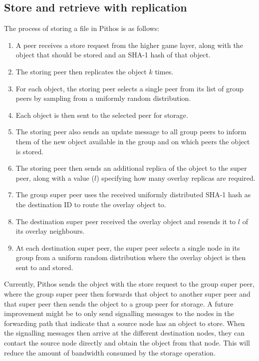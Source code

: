 \documentclass[10pt,a4paper,conference]{IEEEtran}
\begin{document}
\subsection{Store and retrieve with replication}
\label{store_retrieve}

The process of storing a file in Pithos is as follows:
\begin{enumerate}
\item A peer receives a store request from the higher game layer, along with the object that should be stored and an SHA-1 hash of that object.
\item The storing peer then replicates the object $k$ times.
\item For each object, the storing peer selects a single peer from its list of group peers by sampling from a uniformly random distribution.
\item Each object is then sent to the selected peer for storage.
\item The storing peer also sends an update message to all group peers to inform them of the new object available in the group and on which peers
    the object is stored.
\item The storing peer then sends an additional replica of the object to the super peer, along with a value ($l$) specifying how many overlay
    replicas are required.
\item The group super peer uses the received uniformly distributed SHA-1 hash as the destination ID to route the overlay object to.
\item The destination super peer received the overlay object and resends it to $l$ of its overlay neighbours.
\item At each destination super peer, the super peer selects a single node in its group from a uniform random distribution where the overlay
    object is then sent to and stored.
\end{enumerate}

Currently, Pithos sends the object with the store request to the group super peer, where the group super peer then forwards that object to another
super peer and that super peer then sends the object to a group peer for storage. A future improvement might be to only send signalling messages to
the nodes in the forwarding path that indicate that a source node has an object to store. When the signalling messages then arrive at the different
destination nodes, they can contact the source node directly and obtain the object from that node. This will reduce the amount of bandwidth consumed
by the storage operation.
\end{document}
